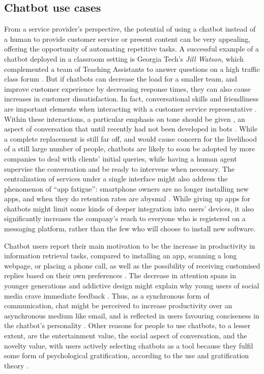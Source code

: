 \subsection{Chatbot use cases}
From a service provider's perspective, the potential of using a chatbot instead of a human to provide customer service or present content can be very appealing, offering the opportunity of automating repetitive tasks. A successful example of a chatbot deployed in a classroom setting is Georgia Tech's \textit{Jill Watson}, which complemented a team of Teaching Assistants to answer questions on a high traffic class forum \cite{Eicher2016}. But if chatbots can decrease the load for a smaller team, and improve customer experience by decreasing response times, they can also cause increases in customer dissatisfaction. In fact, conversational skills and friendliness are important elements when interacting with a customer service representative \cite{Kang2013}. Within these interactions, a particular emphasis on tone should be given \cite{morris1988many}, an aspect of conversation that until recently had not been developed in bots \cite{Hu2018}. While a complete replacement is still far off, and would cause concern for the livelihood of a still large number of people, chatbots are likely to soon be adopted by more companies to deal with clients' initial queries, while having a human agent supervise the conversation and be ready to intervene when necessary. The centralization of services under a single interface might also address the phenomenon of ``app fatigue'': smartphone owners are no longer installing new apps, and when they do retention rates are abysmal \cite{appfatigue}. While giving up apps for chatbots might limit some kinds of deeper integration into users' devices, it also significantly increases the company's reach to everyone who is registered on a messaging platform, rather than the few who will choose to install new software. 

Chatbot users report their main motivation to be the increase in productivity in information retrieval tasks, compared to installing an app, scanning a long webpage, or placing a phone call, as well as the possibility of receiving customised replies based on their own preferences \cite{10.1007/978-3-319-70284-1_30}. The decrease in attention spans in younger generations \cite{Wilmer2017} and addictive design might explain why young users of social media crave immediate feedback \cite{brandtzaeg2016should}. Thus, as a synchronous form of communication, chat might be perceived to increase productivity over an asynchronous medium like email, and is reflected in users favouring conciseness in the chatbot's personality \cite{10.1007/978-3-319-67744-6_28}. Other reasons for people to use chatbots, to a lesser extent, are the entertainment value, the social aspect of conversation, and the novelty value, with users actively selecting chatbots as a tool because they fulfil some form of psychological gratification, according to the use and gratification theory \cite{10.1007/978-3-319-70284-1_30}.
